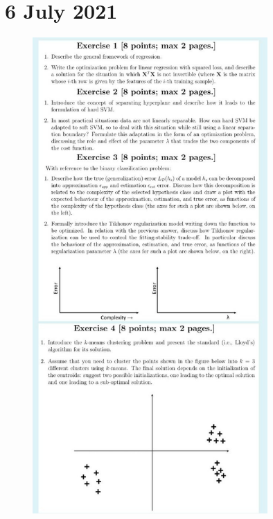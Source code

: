 \documentclass[a4paper,11pt,oneside]{book}
\begin{document}
\chapter{6 July 2021}

\begin{figure}[H]
   \centering
   \includegraphics[width=0.8\textwidth,height=0.8\textheight,keepaspectratio]{images/6_Jul_2021.jpg}
\end{figure}

\clearpage
\end{document}
